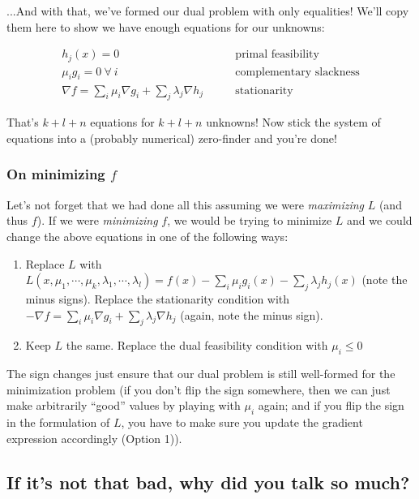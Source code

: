 \documentclass[letterpaper,12pt]{report}
\providecommand{\tightlist}{%
  \setlength{\itemsep}{0pt}\setlength{\parskip}{0pt}}
\begin{document}
...And with that, we've formed our dual problem with only equalities!
We'll copy them here to show we have enough equations for our unknowns:

\[\begin{split} h_j(x) = 0 \qquad            & \text{primal feasibility} \\
\mu_i g_i = 0 \ \forall \ i \qquad           &\text{complementary slackness} \\
\nabla f = \sum _i \mu _i \nabla g_i + \sum _j \lambda _j \nabla h_j \qquad & \text{stationarity}\end{split}\]

That's \(k + l + n\) equations for \(k + l + n\) unknowns! Now stick the
system of equations into a (probably numerical) zero-finder and you're
done!

\subsubsection{\texorpdfstring{On minimizing
\(f\)}{On minimizing f}}\label{on-minimizing-f}

Let's not forget that we had done all this assuming we were
\emph{maximizing} \(L\) (and thus \(f\)). If we were \emph{minimizing}
\(f\), we would be trying to minimize \(L\) and we could change the
above equations in one of the following ways:

\begin{enumerate}
\def\labelenumi{\arabic{enumi}.}
\tightlist
\item
  Replace \(L\) with
  \(L(x,\mu_1, \cdots, \mu_k, \lambda_1, \cdots, \lambda_l) = f(x) - \sum_i \mu_i g_i(x) - \sum_j \lambda_j h_j(x)\)
  (note the minus signs). Replace the stationarity condition with
  \(-\nabla f = \sum _i \mu _i \nabla g_i + \sum _j \lambda _j \nabla h_j\)
  (again, note the minus sign).
\item
  Keep \(L\) the same. Replace the dual feasibility condition with \(
  \mu_i \leq 0 \)
\end{enumerate}

The sign changes just ensure that our dual problem is still well-formed
for the minimization problem (if you don't flip the sign somewhere, then
we can just make arbitrarily ``good'' values by playing with \(\mu_i\)
again; and if you flip the sign in the formulation of \(L\), you have to
make sure you update the gradient expression accordingly (Option 1)).

\subsection{If it's not that bad, why did you talk so
much?}\label{if-its-not-that-bad-why-did-you-talk-so-much}
\end{document}
